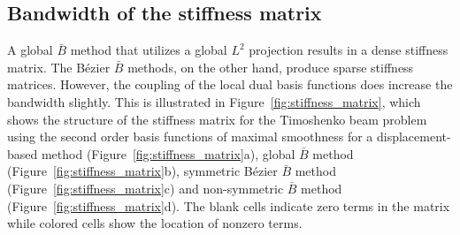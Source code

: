 \subsection{Bandwidth of the stiffness matrix}
A global $\bar{B}$ method that utilizes a global $L^2$ projection results in a dense stiffness matrix. The B\'ezier $\bar{B}$ {methods}, on the other hand, {produce} sparse stiffness matrices. However, the coupling of the local dual basis functions does increase the bandwidth slightly. This is illustrated in Figure~\ref{fig:stiffness_matrix}, which shows the structure of the stiffness matrix for the Timoshenko beam problem using the second order basis functions of maximal smoothness for a displacement-based method (Figure~\ref{fig:stiffness_matrix}a), global $\bar{B}$ method (Figure~\ref{fig:stiffness_matrix}b), symmetric B\'ezier $\bar{B}$ method (Figure~\ref{fig:stiffness_matrix}c) and non-symmetric \Bezier $\bar{B}$ method (Figure~\ref{fig:stiffness_matrix}d). The blank cells indicate zero terms in the matrix while colored cells show the location of nonzero terms.
